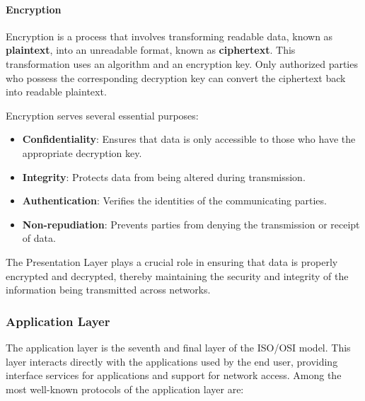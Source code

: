 \paragraph{Encryption}
Encryption is a process that involves transforming readable data, known as \textbf{plaintext}, into an unreadable format, known as \textbf{ciphertext}. This transformation uses an algorithm and an encryption key. Only authorized parties who possess the corresponding decryption key can convert the ciphertext back into readable plaintext.

Encryption serves several essential purposes:

\begin{itemize}
    \item \textbf{Confidentiality}: Ensures that data is only accessible to those who have the appropriate decryption key.
    \item \textbf{Integrity}: Protects data from being altered during transmission.
    \item \textbf{Authentication}: Verifies the identities of the communicating parties.
    \item \textbf{Non-repudiation}: Prevents parties from denying the transmission or receipt of data.
\end{itemize}

The Presentation Layer plays a crucial role in ensuring that data is properly encrypted and decrypted, thereby maintaining the security and integrity of the information being transmitted across networks.


\subsubsection{\textbf{Application Layer}}
The application layer is the seventh and final layer of the ISO/OSI model. This layer interacts directly with the applications used by the end user, providing interface services for applications and support for network access. Among the most well-known protocols of the application layer are:

